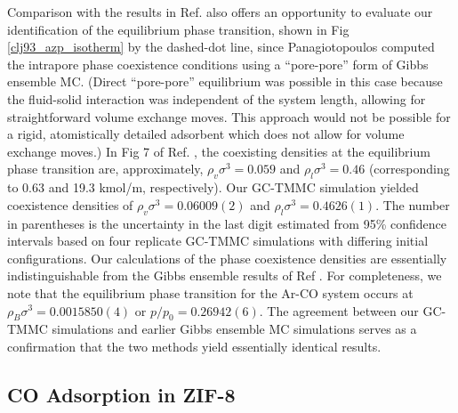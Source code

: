 Comparison with the results in Ref.  also offers an opportunity to evaluate our identification of the equilibrium phase transition, shown in Fig \ref{clj93_azp_isotherm} by the dashed-dot line, since Panagiotopoulos computed the intrapore phase coexistence conditions using a ``pore-pore'' form of Gibbs ensemble MC. (Direct ``pore-pore'' equilibrium was possible in this case because the fluid-solid interaction was independent of the system length, allowing for straightforward volume exchange moves. This approach would not be possible for a rigid, atomistically detailed adsorbent which does not allow for volume exchange moves.) In Fig 7 of Ref. , the coexisting densities at the equilibrium phase transition are, approximately, $\rho_v \sigma^3 = 0.059$ and $\rho_l \sigma^3 = 0.46$ (corresponding to 0.63 and 19.3 kmol/m, respectively). Our GC-TMMC simulation yielded coexistence densities of $\rho_v \sigma^3 = 0.06009(2)$ and  $\rho_l \sigma^3 = 0.4626(1)$. The number in parentheses is the uncertainty in the last digit estimated from 95\% confidence intervals based on four replicate GC-TMMC simulations with differing initial configurations. Our calculations of the phase coexistence densities are essentially indistinguishable from the Gibbs ensemble results of Ref . For completeness, we note that the equilibrium phase transition for the Ar-CO system occurs at $\rho_B \sigma^3 = 0.0015850(4)$ or $p/p_0 = 0.26942(6)$. The agreement between our GC-TMMC simulations and earlier Gibbs ensemble MC simulations serves as a confirmation that the two methods yield essentially identical results. 

\subsection{CO Adsorption in ZIF-8}

